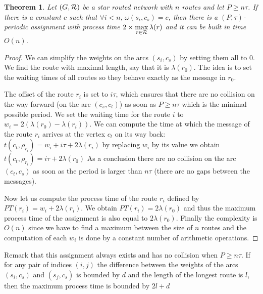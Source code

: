 \documentclass[10pt, conference, letterpaper]{IEEEtran}
\newtheorem{theorem}{Theorem}
\begin{document}
	 \begin{theorem}
	 Let $(G,{\cal R})$ be a star routed network with $n$ routes and let $P \geq n\tau$. If there is a constant $c$ such that $\forall i < n, \,\omega(s_i,c_s) = c$, then there is a $(P,\tau)$-periodic assignment with process time $2 \times \displaystyle{\max_{r\in {\cal R}} \lambda(r)}$ and it can be built in time $O(n)$.
	 \end{theorem}
      \begin{proof}
      
        We can simplify the weights on the arcs $(s_i,c_s)$ by setting them all to $0$.
        We find the route with maximal length, say that it is $\lambda(r_0)$. The idea is to 
        set the waiting times of all routes so they behave exactly as the message in $r_0$.
        
        The offset of the route $r_i$ is set to $i\tau$, which ensures that there are no collision on the way forward (on the arc $(c_s,c_t)$) as soon as $P \geq n\tau$ which is the minimal possible period. We set the waiting time for the route $i$ to $w_i = 2(\lambda(r_{0}) - \lambda(r_{i}))$. We can compute the time at which the message of the route $r_i$ arrives at the vertex $c_t$ on its way back: $t(c_t,\rho_{r_i}) = w_i + i\tau + 2\lambda(r_{i})$
        by replacing $w_i$ by its value we obtain $t(c_t,\rho_{r_i}) =  i\tau + 2\lambda(r_{0})$
        As a conclusion there are no collision on the arc $(c_t,c_s)$ as soon as the 
        period is larger than $n\tau$ (there are no gaps between the messages).
        
        Now let us compute the process time of the route $r_i$ defined by $PT(r_i) = w_i + 2\lambda(r_{i}) $. We obtain $PT(r_i) = 2\lambda(r_{0})$ and thus the maximum process time of the assignment is also equal to $2\lambda(r_0)$.
	Finally the complexity is $O(n)$ since we have to find a maximum between the size of $n$ routes and the computation of each $w_i$ is done by a constant number of arithmetic operations.
     \end{proof}
     
     Remark that this assignment always exists and has no collision when $P \geq n\tau$. 
     If for any pair of indices $(i,j)$ the difference between the weights of the arcs $(s_i,c_s)$ and $(s_j,c_s)$ is bounded 
     by $d$ and the length of the longest route is $l$, then the maximum process time is bounded by  $2l + d$
     
\end{document}
